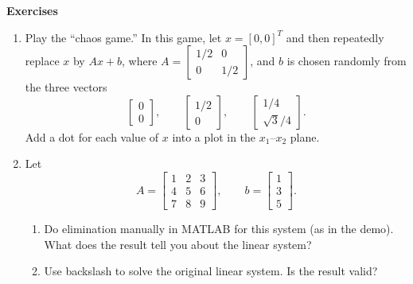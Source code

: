 \documentclass[11pt]{article}
\begin{document}
\begin{center}
  \bf Exercises
\end{center}

\begin{enumerate}
\item Play the ``chaos game.'' In this game, let $x=[0,0]^T$ and then
  repeatedly replace $x$ by $Ax+b$, where $A=\displaystyle
  \begin{bmatrix}
    1/2&0\\0&1/2
  \end{bmatrix}$, and $b$ is chosen randomly from the three vectors
\[
\begin{bmatrix}
  0\\0
\end{bmatrix}, \qquad
\begin{bmatrix}
  1/2\\0
\end{bmatrix},\qquad
\begin{bmatrix}
  1/4\\ \sqrt{3}/4
\end{bmatrix}.
\]
Add a dot for each value of $x$ into a plot in the $x_1$--$x_2$
plane.
\item Let 
\[
A=
\begin{bmatrix}
  1&2&3\\4&5&6\\7&8&9
\end{bmatrix}, \qquad b=
\begin{bmatrix}
  1\\3\\5
\end{bmatrix}.
\]

\begin{enumerate}
\item Do elimination manually in MATLAB for this system (as in the
  demo). What does the result tell you about the linear system?
\item Use backslash to solve the original linear system. Is the result valid?
\end{enumerate}



\end{enumerate}
\end{document}
